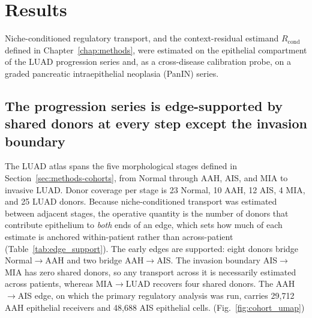 
\chapter{Results}
\label{chap:results}

Niche-conditioned regulatory transport, and the context-residual estimand $R_{\text{cond}}$ defined in Chapter~\ref{chap:methods}, were estimated on the epithelial compartment of the LUAD progression series and, as a cross-disease calibration probe, on a graded pancreatic intraepithelial neoplasia (PanIN) series.

\section{The progression series is edge-supported by shared donors at every step except the invasion boundary}
\label{sec:cohort}

The LUAD atlas spans the five morphological stages defined in Section~\ref{sec:methods-cohorts}, from Normal through AAH, AIS, and MIA to invasive LUAD. Donor coverage per stage is 23 Normal, 10 AAH, 12 AIS, 4 MIA, and 25 LUAD donors. Because niche-conditioned transport was estimated between adjacent stages, the operative quantity is the number of donors that contribute epithelium to \emph{both} ends of an edge, which sets how much of each estimate is anchored within-patient rather than across-patient (Table~\ref{tab:edge_support}). The early edges are supported: eight donors bridge Normal$\rightarrow$AAH and two bridge AAH$\rightarrow$AIS. The invasion boundary AIS$\rightarrow$MIA has zero shared donors, so any transport across it is necessarily estimated across patients, whereas MIA$\rightarrow$LUAD recovers four shared donors. The AAH$\rightarrow$AIS edge, on which the primary regulatory analysis was run, carries 29{,}712 AAH epithelial receivers and 48{,}688 AIS epithelial cells. (Fig.~\ref{fig:cohort_umap})

